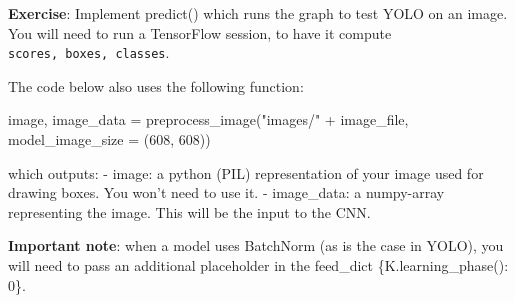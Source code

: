 \documentclass[11pt]{article}
\newenvironment{Shaded}{}{}
\newcommand{\DecValTok}[1]{\textcolor[rgb]{0.25,0.63,0.44}{{#1}}}
\newcommand{\StringTok}[1]{\textcolor[rgb]{0.25,0.44,0.63}{{#1}}}
\newcommand{\NormalTok}[1]{{#1}}
\newcommand{\OperatorTok}[1]{\textcolor[rgb]{0.40,0.40,0.40}{{#1}}}
\begin{document}
\textbf{Exercise}: Implement predict() which runs the graph to test YOLO
on an image. You will need to run a TensorFlow session, to have it
compute \texttt{scores,\ boxes,\ classes}.

The code below also uses the following function:

\begin{Shaded}
\begin{Highlighting}[]
\NormalTok{image, image_data }\OperatorTok{=}\NormalTok{ preprocess_image(}\StringTok{"images/"} \OperatorTok{+}\NormalTok{ image_file, model_image_size }\OperatorTok{=}\NormalTok{ (}\DecValTok{608}\NormalTok{, }\DecValTok{608}\NormalTok{))}
\end{Highlighting}
\end{Shaded}

which outputs: - image: a python (PIL) representation of your image used
for drawing boxes. You won't need to use it. - image\_data: a
numpy-array representing the image. This will be the input to the CNN.

\textbf{Important note}: when a model uses BatchNorm (as is the case in
YOLO), you will need to pass an additional placeholder in the feed\_dict
\{K.learning\_phase(): 0\}.
\end{document}
